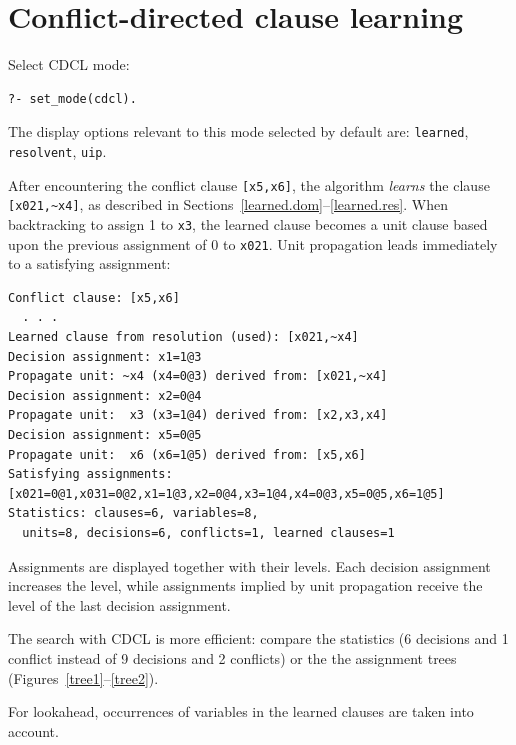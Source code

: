 \documentclass[11pt]{report}
\newcommand*{\p}[1]{\textup{\texttt{#1}}}
\begin{document}

\newpage

\section{Conflict-directed clause learning}

Select CDCL mode:
\begin{verbatim}
?- set_mode(cdcl).
\end{verbatim}

The display options relevant to this mode selected by default are:
\p{learned}, \p{resolvent}, \p{uip}.

After encountering the conflict clause \verb+[x5,x6]+, the algorithm \emph{learns} the clause \verb+[x021,~x4]+, as described in Sections~\ref{learned.dom}--\ref{learned.res}. When backtracking to assign 1 to \p{x3}, the learned clause becomes a unit clause based upon the previous assignment of 0 to \p{x021}. Unit propagation leads immediately to a satisfying assignment:

\begin{verbatim}
Conflict clause: [x5,x6]
  . . .
Learned clause from resolution (used): [x021,~x4]
Decision assignment: x1=1@3
Propagate unit: ~x4 (x4=0@3) derived from: [x021,~x4]
Decision assignment: x2=0@4
Propagate unit:  x3 (x3=1@4) derived from: [x2,x3,x4]
Decision assignment: x5=0@5
Propagate unit:  x6 (x6=1@5) derived from: [x5,x6]
Satisfying assignments:
[x021=0@1,x031=0@2,x1=1@3,x2=0@4,x3=1@4,x4=0@3,x5=0@5,x6=1@5]
Statistics: clauses=6, variables=8,
  units=8, decisions=6, conflicts=1, learned clauses=1
\end{verbatim}
Assignments are displayed together with their levels. Each decision
assignment increases the level, while assignments implied by unit
propagation receive the level of the last decision assignment. 

The search with CDCL is more efficient: compare the statistics (6
decisions and 1 conflict instead of 9 decisions and 2 conflicts) or the
the assignment trees (Figures~\ref{tree1}--\ref{tree2}).

\bigskip

For lookahead, occurrences of variables in the learned clauses are taken into account.
\end{document}
